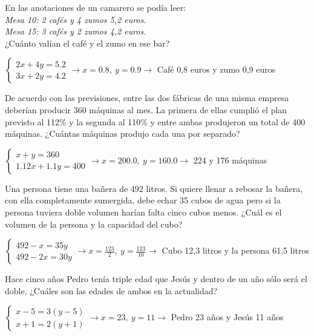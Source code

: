 \documentclass[spanish, 12pt]{exam}
\begin{document}
\begin{questions}
\question En las anotaciones de un camarero se podía leer: \\
	\emph{Mesa 10: 2 cafés y 4 zumos 5,2 euros.\\
	Mesa 15: 3 cafés y 2 zumos 4,2 euros.}\\
¿Cuánto valían el café y el zumo en ese bar?
\begin{solution} $\left\{\begin{matrix}2x+4y=5.2 \\ 3x+2y=4.2\end{matrix}\right. \to  x = 0.8, \  y = 0.9 \to $ Café 0,8 euros y zumo 0,9 euros \end{solution}

\question De acuerdo con las previsiones, entre las dos fábricas de una misma empresa deberían producir 360 máquinas al mes. La primera de ellas cumplió el plan previsto al 112\% y la segunda al 110\% y entre ambas produjeron un total de 400 máquinas. ¿Cuántas máquinas produjo cada una por separado?
\begin{solution} $\left\{\begin{matrix}x+y=360 \\ 1.12x+1.1y=400\end{matrix}\right. \to  x = 200.0, \  y = 160.0 \to $
 224 y 176 máquinas \end{solution}

\question Una persona tiene una bañera de 492 litros. Si quiere llenar a rebosar la bañera, con ella completamente sumergida, debe echar 35 cubos de agua pero si la persona tuviera doble volumen harían falta cinco cubos menos. ¿Cuál es el volumen de la persona y la capacidad del cubo?
\begin{solution} $\left\{\begin{matrix}492-x=35y \\ 492-2x=30y\end{matrix}\right. \to  x = \frac{123}{2}, \  y = \frac{123}{10} \to $ Cubo 12,3 litros y la persona 61,5 litros \end{solution}

\question Hace cinco años Pedro tenía triple edad que Jesús y dentro de un año sólo será el doble. ¿Cuáles son las edades de ambos en la actualidad?
\begin{solution}$\left\{\begin{matrix}x-5=3(y-5) \\ x+1=2(y+1)\end{matrix}\right. \to  x = 23, \  y = 11 \to $ Pedro 23 años y Jesús 11 años \end{solution}


\end{questions}
\end{document}
